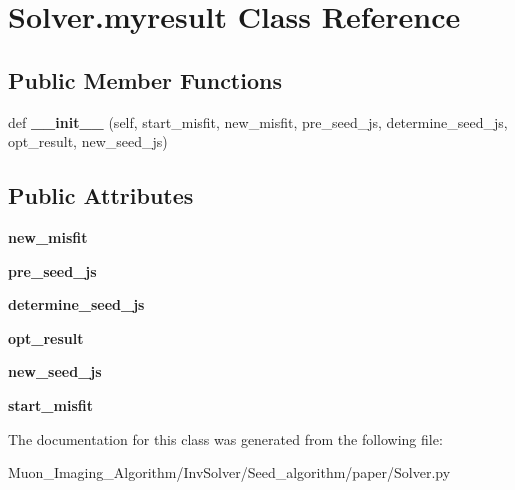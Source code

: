 \hypertarget{classSolver_1_1myresult}{}\section{Solver.\+myresult Class Reference}
\label{classSolver_1_1myresult}
\subsection*{Public Member Functions}
\begin{DoxyCompactItemize}
\item 
\mbox{\label{classSolver_1_1myresult_a5f007bdd94cdacad9cfae0fae293ef76}} 
def {\bfseries \+\_\+\+\_\+init\+\_\+\+\_\+} (self, start\+\_\+misfit, new\+\_\+misfit, pre\+\_\+seed\+\_\+js, determine\+\_\+seed\+\_\+js, opt\+\_\+result, new\+\_\+seed\+\_\+js)
\end{DoxyCompactItemize}
\subsection*{Public Attributes}
\begin{DoxyCompactItemize}
\item 
\mbox{\label{classSolver_1_1myresult_ac95025b39dbb687f2b98b830fca9a9ae}} 
{\bfseries new\+\_\+misfit}
\item 
\mbox{\label{classSolver_1_1myresult_a42f5e67c80ca49b530e07badf0efbc39}} 
{\bfseries pre\+\_\+seed\+\_\+js}
\item 
\mbox{\label{classSolver_1_1myresult_a8b68af83cc880cb9d08ceb385bcbbf86}} 
{\bfseries determine\+\_\+seed\+\_\+js}
\item 
\mbox{\label{classSolver_1_1myresult_a80ab7f9b7a19bb183f9d7ef6d9253ac1}} 
{\bfseries opt\+\_\+result}
\item 
\mbox{\label{classSolver_1_1myresult_ab08d7565ade7d2c2bdad300cf5681a82}} 
{\bfseries new\+\_\+seed\+\_\+js}
\item 
\mbox{\label{classSolver_1_1myresult_a6e118da59929dc8191afff076f31c1db}} 
{\bfseries start\+\_\+misfit}
\end{DoxyCompactItemize}


The documentation for this class was generated from the following file\+:\begin{DoxyCompactItemize}
\item 
Muon\+\_\+\+Imaging\+\_\+\+Algorithm/\+Inv\+Solver/\+Seed\+\_\+algorithm/paper/Solver.\+py\end{DoxyCompactItemize}
